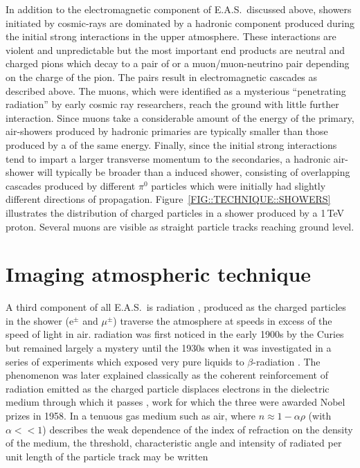In addition to the electromagnetic component of E.A.S.\ discussed
above, showers initiated by cosmic-rays are dominated by a hadronic
component produced during the initial strong interactions in the upper
atmosphere. These interactions are violent and unpredictable but the
most important end products are neutral and charged pions which decay
to a pair of \Grays or a muon/muon-neutrino pair depending on the
charge of the pion. The
\Gray pairs result in electromagnetic cascades as described above. The
muons, which were identified as a mysterious ``penetrating radiation''
by early cosmic ray researchers, reach the ground with little further
interaction. Since muons take a considerable amount of the energy of
the primary, air-showers produced by hadronic primaries are typically
smaller than those produced by a \Gray of the same energy. Finally,
since the initial strong interactions tend to impart a larger
transverse momentum to the secondaries, a hadronic air-shower will
typically be broader than a \Gray induced shower, consisting of
overlapping cascades produced by different $\pi^0$ particles which
were initially had slightly different directions of propagation. 
Figure~\ref{FIG::TECHNIQUE::SHOWERS} illustrates the distribution of
charged particles in a shower produced by a 1\,TeV proton. Several
muons are visible as straight particle tracks reaching ground level.

\section{Imaging atmospheric \Cerenkov technique}
\label{SEC::TECHNIQUE::IACT}

A third component of all E.A.S.\ is \Cerenkov radiation
\citep{REF::JELLEY::BOOK1958}, produced as
the charged particles in the shower (e$^\pm$ and $\mu^\pm$) traverse
the atmosphere at speeds in excess of the speed of light in
air. \Cerenkov radiation was first noticed in the early 1900s by the
Curies but remained largely a mystery until the 1930s when it was
investigated in a series of experiments which exposed very pure
liquids to $\beta$-radiation \citep{REF::CERENKOV::1934}. The
phenomenon was later explained classically as the coherent
reinforcement of radiation emitted as the charged particle displaces
electrons in the dielectric medium through which it passes
\citep{REF::FRANKTAMM::1937}, work for which the three were awarded
Nobel prizes in 1958. In a tenuous gas medium such as air, where
$n\approx 1-\alpha\rho$ (with $\alpha<<1$) describes the weak
dependence of the index of refraction on the density of the medium,
the \Cerenkov threshold, characteristic angle and intensity of
radiated per unit length of the particle track
\citep{REF::JACKSON::CHAP13} may be written

